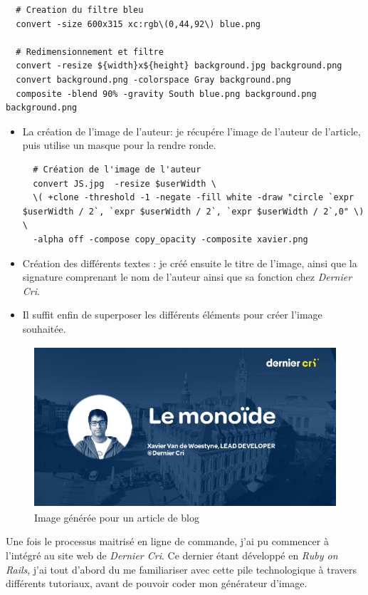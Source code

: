 \documentclass[12pt,a4paper]{article}
\begin{document}
  \begin{verbatim}
  # Creation du filtre bleu
  convert -size 600x315 xc:rgb\(0,44,92\) blue.png

  # Redimensionnement et filtre
  convert -resize ${width}x${height} background.jpg background.png
  convert background.png -colorspace Gray background.png
  composite -blend 90% -gravity South blue.png background.png background.png
  \end{verbatim}

  \begin{itemize}
  \item
    La création de l'image de l'auteur: je récupére l'image de l'auteur de
    l'article, puis utilise un masque pour la rendre ronde.

  \begin{verbatim}
  # Création de l'image de l'auteur
  convert JS.jpg  -resize $userWidth \
  \( +clone -threshold -1 -negate -fill white -draw "circle `expr $userWidth / 2`, `expr $userWidth / 2`, `expr $userWidth / 2`,0" \) \
  -alpha off -compose copy_opacity -composite xavier.png
  \end{verbatim}
  \item
    Création des différents textes : je créé ensuite le titre de l'image,
    ainsi que la signature comprenant le nom de l'auteur ainsi que sa
    fonction chez \emph{Dernier Cri}.
  \item
    Il suffit enfin de superposer les différents éléments pour créer
    l'image souhaitée.
  \end{itemize}

  \begin{figure}[h]
    \centering
    \includegraphics[height=6cm]{figures/blog.png}
    \caption{Image générée pour un article de blog}
  \end{figure}

  \bigskip

  Une fois le processus maitrisé en ligne de commande, j'ai pu commencer à
  l'intégré au site web de \emph{Dernier Cri}. Ce dernier étant développé
  en \emph{Ruby on Rails}, j'ai tout d'abord du me familiariser avec cette
  pile technologique à travers différents tutoriaux, avant de pouvoir
  coder mon générateur d'image.
\end{document}

